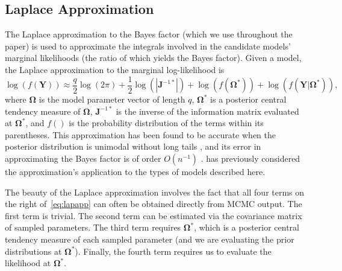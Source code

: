 \subsection{Laplace Approximation}
The Laplace approximation to the Bayes factor (which we use throughout the paper) is used to approximate the integrals involved in the candidate models' marginal likelihoods (the ratio of which yields the Bayes factor). Given a model, the Laplace approximation to the marginal log-likelihood is \cite{lewraf97}
\begin{equation} \label{eq:lapapp}
    \log( f(\bm{Y})) \approx \frac{q}{2} \log(2\pi) + \frac{1}{2} \log(|\bm{J}^{-1*}|) + \log( f(\bm{\Omega}^*)) + \log( f(\bm{Y} | \bm{\Omega}^*)),
\end{equation}
where $\bm{\Omega}$ is the model parameter vector of length $q$, $\bm{\Omega}^*$ is a posterior central tendency measure of $\bm{\Omega}$, $\bm{J}^{-1*}$ is the inverse of the information matrix evaluated at $\bm{\Omega}^*$, and $f()$ is the probability distribution of the terms within its parentheses. This approximation has been found to be accurate when the posterior distribution is unimodal without long tails \cite{lewraf97,tiekad86}, and its error in approximating the Bayes factor is of order $O(n^{-1})$ \cite{kasraf95}.   has previously considered the approximation's application to the types of models described here.

The beauty of the Laplace approximation involves the fact that all four terms on the right of~\eqref{eq:lapapp} can often be obtained directly from MCMC output.  The first term is trivial.  The second term can be estimated via the covariance matrix of sampled parameters.  The third term requires $\bm{\Omega}^*$, which is a posterior central tendency measure of each sampled parameter (and we are evaluating the prior distributions at $\bm{\Omega}^*$).  Finally, the fourth term requires us to evaluate the likelihood at $\bm{\Omega}^*$.  

